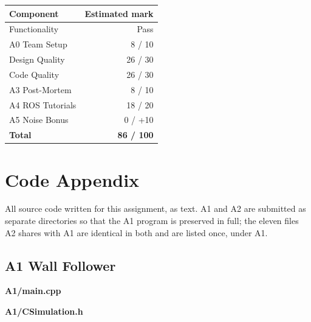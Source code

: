 \documentclass[10pt]{article}
\begin{document}
\begin{table}[H]
\centering
\begin{tabular}{lr}
\toprule
Component & Estimated mark \\
\midrule
Functionality       & Pass \\
A0 Team Setup       & 8 / 10\\
Design Quality      & 26 / 30\\
Code Quality        & 26 / 30\\
A3 Post-Mortem      & 8 / 10\\
A4 ROS Tutorials    & 18 / 20\\
A5 Noise Bonus      & 0 / +10\\
\midrule
\textbf{Total}      & \textbf{86 / 100}\\
\bottomrule
\end{tabular}
\end{table}


\section{Code Appendix}

All source code written for this assignment, as text. A1 and A2 are submitted
as separate directories so that the A1 program is preserved in full; the
eleven files A2 shares with A1 are identical in both and are listed once,
under A1.

\begingroup
{}

\subsection*{A1 Wall Follower}

\noindent\textbf{\ttfamily\small A1/main.cpp}


\noindent\textbf{\ttfamily\small A1/CSimulation.h}

\end{document}
